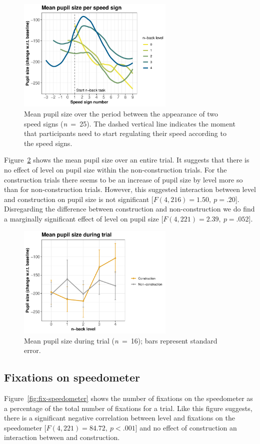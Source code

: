 \begin{figure}
  \centering
  \includegraphics[width=7.5cm]{images/speed_sign_nback.pdf}
  \caption{Mean pupil size over the period between the appearance of two speed signs (\textit{n}\ =\ 25).
  The dashed vertical line indicates the moment that participants need to start regulating their speed according to the speed signs.}
  \label{fig:ps-speed-sign}
\end{figure}

Figure~\ref{fig:mean-ps} shows the mean pupil size over an entire trial. 
It suggests that there is no effect of \nback level on pupil size within the non-construction trials.
For the construction trials there seems to be an increase of pupil size by \nback level more so than for non-construction trials.
However, this suggested interaction between \nback level and construction on pupil size is not significant [\(F(4,216)=1.50,\ p=.20\)].
Disregarding the difference between construction and non-construction we do find a marginally significant effect of \nback level on pupil size [\(F(4,221)=2.39,\ p=.052\)].

\begin{figure}
  \centering
  \includegraphics[width=7.5cm]{images/pupil_size_interaction.pdf}
  \caption{Mean pupil size during trial (\textit{n}\ =\ 16); bars represent standard error.}
  \label{fig:mean-ps}
\end{figure}

\subsection{Fixations on speedometer}
Figure~\ref{fig:fix-speedometer} shows the number of fixations on the speedometer as a percentage of the total number of fixations for a trial.
Like this figure suggests, there is a significant negative correlation between \nback level and fixations on the speedometer [\(F(4,221)=84.72,\ p<.001\)] 
and no effect of construction an interaction between \nback and construction. 

